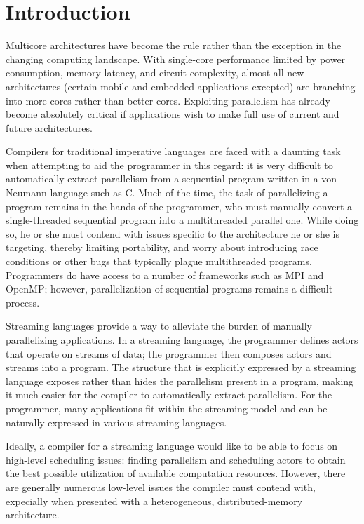\section{Introduction}

Multicore architectures have become the rule rather than the exception in the changing computing landscape. With single-core performance limited by power consumption, memory latency, and circuit complexity, almost all new architectures (certain mobile and embedded applications excepted) are branching into more cores rather than better cores. Exploiting parallelism has already become absolutely critical if applications wish to make full use of current and future architectures.

Compilers for traditional imperative languages are faced with a daunting task when attempting to aid the programmer in this regard: it is very difficult to automatically extract parallelism from a sequential program written in a von Neumann language such as C. Much of the time, the task of parallelizing a program remains in the hands of the programmer, who must manually convert a single-threaded sequential program into a multithreaded parallel one. While doing so, he or she must contend with issues specific to the architecture he or she is targeting, thereby limiting portability, and worry about introducing race conditions or other bugs that typically plague multithreaded programs. Programmers do have access to a number of frameworks such as MPI and OpenMP; however, parallelization of sequential programs remains a difficult process.

Streaming languages provide a way to alleviate the burden of manually parallelizing applications. In a streaming language, the programmer defines actors that operate on streams of data; the programmer then composes actors and streams into a program. The structure that is explicitly expressed by a streaming language exposes rather than hides the parallelism present in a program, making it much easier for the compiler to automatically extract parallelism. For the programmer, many applications fit within the streaming model and can be naturally expressed in various streaming languages.

Ideally, a compiler for a streaming language would like to be able to focus on high-level scheduling issues: finding parallelism and scheduling actors to obtain the best possible utilization of available computation resources. However, there are generally numerous low-level issues the compiler must contend with, expecially when presented with a heterogeneous, distributed-memory architecture.

